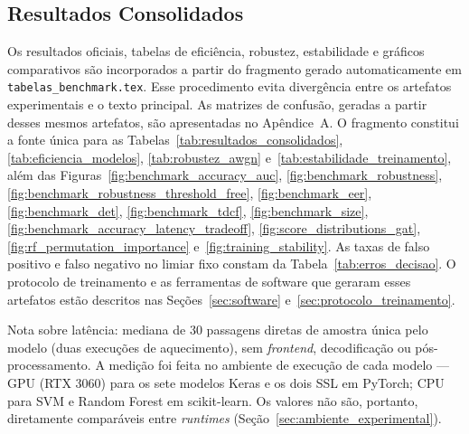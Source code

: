 \documentclass[12pt,a4paper]{article}
\begin{document}

\newpage



\subsection{Resultados Consolidados}
\label{sec:resultados_consolidados}

Os resultados oficiais, tabelas de eficiência, robustez, estabilidade e gráficos
comparativos são incorporados a partir do fragmento gerado automaticamente em
\texttt{tabelas\_benchmark.tex}. Esse procedimento evita divergência entre os
artefatos experimentais e o texto principal. As matrizes de confusão, geradas a
partir desses mesmos artefatos, são apresentadas no Apêndice~A. O fragmento
constitui a fonte única para as
Tabelas~\ref{tab:resultados_consolidados}, \ref{tab:eficiencia_modelos},
\ref{tab:robustez_awgn} e~\ref{tab:estabilidade_treinamento}, além das
Figuras~\ref{fig:benchmark_accuracy_auc}, \ref{fig:benchmark_robustness},
\ref{fig:benchmark_robustness_threshold_free},
\ref{fig:benchmark_eer}, \ref{fig:benchmark_det}, \ref{fig:benchmark_tdcf},
\ref{fig:benchmark_size}, \ref{fig:benchmark_accuracy_latency_tradeoff},
\ref{fig:score_distributions_gat}, \ref{fig:rf_permutation_importance}
e~\ref{fig:training_stability}. As taxas de falso
positivo e falso negativo no limiar fixo constam da
Tabela~\ref{tab:erros_decisao}. O
protocolo de treinamento e as ferramentas de software que geraram esses
artefatos estão descritos nas Seções~\ref{sec:software}
e~\ref{sec:protocolo_treinamento}.


\FloatBarrier

\noindent\footnotesize{Nota sobre latência: mediana de \num{30} passagens
	diretas de amostra única pelo modelo (duas execuções de aquecimento), sem
	\textit{frontend}, decodificação ou pós-processamento. A medição foi feita no
	ambiente de execução de cada modelo --- GPU (RTX 3060) para os sete modelos
	Keras e os dois SSL em PyTorch; CPU para SVM e Random Forest em scikit-learn.
	Os valores não são, portanto, diretamente comparáveis entre \textit{runtimes}
	(Seção~\ref{sec:ambiente_experimental}).}\normalsize
\end{document}
